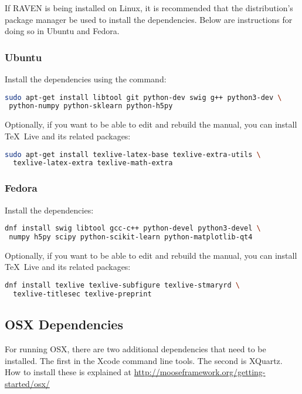 If RAVEN is being installed on Linux, it is recommended that the
distribution's package manager be used to install the dependencies.
Below are instructions for doing so in Ubuntu and Fedora.

\subsubsection{Ubuntu}

Install the dependencies using the command:

\begin{lstlisting}[language=bash]
sudo apt-get install libtool git python-dev swig g++ python3-dev \
 python-numpy python-sklearn python-h5py
\end{lstlisting}

Optionally, if you want to be able to edit and rebuild the manual, you can
install \TeX~Live and its related packages:
\begin{lstlisting}[language=bash]
sudo apt-get install texlive-latex-base texlive-extra-utils \
  texlive-latex-extra texlive-math-extra
\end{lstlisting}

\goToRavenInstallation

\subsubsection{Fedora}

Install the dependencies:

\begin{lstlisting}[language=bash]
dnf install swig libtool gcc-c++ python-devel python3-devel \
 numpy h5py scipy python-scikit-learn python-matplotlib-qt4
\end{lstlisting}

Optionally, if you want to be able to edit and rebuild the manual, you can
install \TeX~Live and its related packages:
\begin{lstlisting}[language=bash]
dnf install texlive texlive-subfigure texlive-stmaryrd \
  texlive-titlesec texlive-preprint
\end{lstlisting}

\goToRavenInstallation

\subsection{OSX Dependencies}
\label{osx_dependencies}

For running OSX, there are two additional dependencies that need to be
installed.  The first in the Xcode command line tools.  The second is
XQuartz.  How to install these is explained at
\url{http://mooseframework.org/getting-started/osx/}

